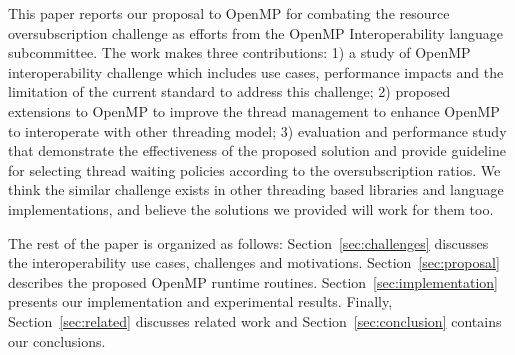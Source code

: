 
This paper reports our proposal to OpenMP for combating the resource oversubscription challenge as efforts from
the OpenMP Interoperability language subcommittee. The work makes three contributions: 1) a study 
of OpenMP interoperability challenge which includes use cases, performance impacts and the limitation 
of the current standard to address this challenge; 2) proposed extensions to OpenMP to improve the thread
management to enhance OpenMP to interoperate with other threading model; 3) evaluation and performance
study that demonstrate the effectiveness of the proposed solution and provide guideline for selecting thread
waiting policies according to the oversubscription ratios. 
We think the similar challenge exists in other threading based libraries and language implementations, and believe
the solutions we provided  will work for them too.  

The rest of the paper is organized as follows: Section~\ref{sec:challenges} discusses the interoperability 
use cases, challenges and motivations. 
 Section~\ref{sec:proposal} describes the proposed OpenMP runtime routines.
 Section~\ref{sec:implementation} presents our implementation and experimental results. 
 Finally, Section~\ref{sec:related} discusses related
work and Section~\ref{sec:conclusion} contains our conclusions.







